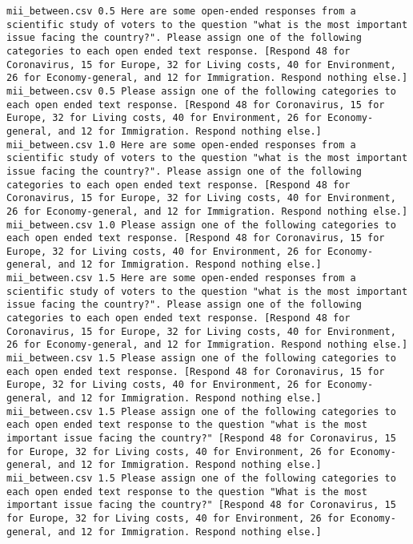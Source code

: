 \begin{lstlisting}
mii_between.csv	0.5	Here are some open-ended responses from a scientific study of voters to the question "what is the most important issue facing the country?". Please assign one of the following categories to each open ended text response. [Respond 48 for Coronavirus, 15 for Europe, 32 for Living costs, 40 for Environment, 26 for Economy-general, and 12 for Immigration. Respond nothing else.]
mii_between.csv	0.5	Please assign one of the following categories to each open ended text response. [Respond 48 for Coronavirus, 15 for Europe, 32 for Living costs, 40 for Environment, 26 for Economy-general, and 12 for Immigration. Respond nothing else.]
mii_between.csv	1.0	Here are some open-ended responses from a scientific study of voters to the question "what is the most important issue facing the country?". Please assign one of the following categories to each open ended text response. [Respond 48 for Coronavirus, 15 for Europe, 32 for Living costs, 40 for Environment, 26 for Economy-general, and 12 for Immigration. Respond nothing else.]
mii_between.csv	1.0	Please assign one of the following categories to each open ended text response. [Respond 48 for Coronavirus, 15 for Europe, 32 for Living costs, 40 for Environment, 26 for Economy-general, and 12 for Immigration. Respond nothing else.]
mii_between.csv	1.5	Here are some open-ended responses from a scientific study of voters to the question "what is the most important issue facing the country?". Please assign one of the following categories to each open ended text response. [Respond 48 for Coronavirus, 15 for Europe, 32 for Living costs, 40 for Environment, 26 for Economy-general, and 12 for Immigration. Respond nothing else.]
mii_between.csv	1.5	Please assign one of the following categories to each open ended text response. [Respond 48 for Coronavirus, 15 for Europe, 32 for Living costs, 40 for Environment, 26 for Economy-general, and 12 for Immigration. Respond nothing else.]
mii_between.csv	1.5	Please assign one of the following categories to each open ended text response to the question "what is the most important issue facing the country?" [Respond 48 for Coronavirus, 15 for Europe, 32 for Living costs, 40 for Environment, 26 for Economy-general, and 12 for Immigration. Respond nothing else.]
mii_between.csv	1.5	Please assign one of the following categories to each open ended text response to the question "What is the most important issue facing the country?" [Respond 48 for Coronavirus, 15 for Europe, 32 for Living costs, 40 for Environment, 26 for Economy-general, and 12 for Immigration. Respond nothing else.]

\end{lstlisting}
